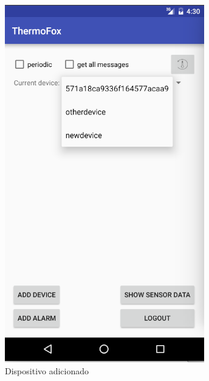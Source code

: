 \documentclass[a4paper]{article}
\begin{document}
\begin{figure}[H]
  \includegraphics[width=\linewidth]{dropdown.png}
  \caption{Dispositivo adicionado}\label{fig:dropdown}
\endminipage\hfill
{}%

\end{figure}
\end{document}
